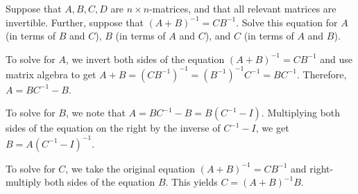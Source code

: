 \begin{ex}
  Suppose that $A,B,C,D$ are $n\times n$-matrices, and that all
  relevant matrices are invertible. Further, suppose that $(A+B)^{-1}
  = CB^{-1}$. Solve this equation for $A$ (in terms of $B$ and $C$),
  $B$ (in terms of $A$ and $C$), and $C$ (in terms of $A$ and $B$).
  \begin{sol}
    To solve for $A$, we invert both sides of the equation
    $(A+B)^{-1} = CB^{-1}$ and use matrix algebra to get
    $A+B = (CB^{-1})^{-1} = (B^{-1})^{-1}C^{-1} = BC^{-1}$. Therefore,
    $A = BC^{-1} - B$.

    To solve for $B$, we note that $A = BC^{-1} - B = B(C^{-1}-I)$.
    Multiplying both sides of the equation on the right by the inverse
    of $C^{-1}-I$, we get $B = A(C^{-1}-I)^{-1}$.

    To solve for $C$, we take the original equation
    $(A+B)^{-1} = CB^{-1}$ and right-multiply both sides of the
    equation $B$. This yields $C = (A+B)^{-1}B$.
  \end{sol}
\end{ex}
